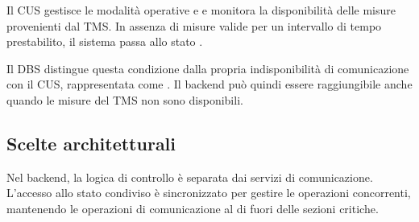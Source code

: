Il CUS gestisce le modalità operative  e  e monitora la disponibilità delle misure provenienti dal TMS.
In assenza di misure valide per un intervallo di tempo prestabilito, il sistema passa allo stato .

Il DBS distingue questa condizione dalla propria indisponibilità di comunicazione con il CUS, rappresentata come .
Il backend può quindi essere raggiungibile anche quando le misure del TMS non sono disponibili.

\subsection{Scelte architetturali}

Nel backend, la logica di controllo è separata dai servizi di comunicazione.
L'accesso allo stato condiviso è sincronizzato per gestire le operazioni concorrenti, mantenendo le operazioni di comunicazione al di fuori delle sezioni critiche.
